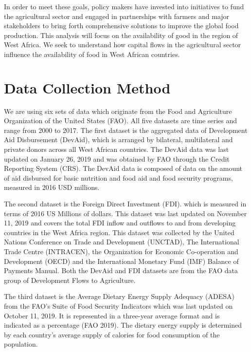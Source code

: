 \documentclass[
]{article}
\begin{document}
In order to meet these goals, policy makers have invested into
initiatives to fund the agricultural sector and engaged in partnerships
with farmers and major stakeholders to bring forth comprehensive
solutions to improve the global food production. This analysis will
focus on the availability of good in the region of West Africa. We seek
to understand how capital flows in the agricultural sector influence the
availability of food in West African countries.

\hypertarget{data-collection-method}{%
\section{Data Collection Method}\label{data-collection-method}}

We are using six sets of data which originate from the Food and
Agriculture Organization of the United States (FAO). All five datasets
are time series and range from 2000 to 2017. The first dataset is the
aggregated data of Development Aid Disbursement (DevAid), which is
arranged by bilateral, multilateral and private donors across all West
African countries. The DevAid data was last updated on January 26, 2019
and was obtained by FAO through the Credit Reporting System (CRS). The
DevAid data is composed of data on the amount of aid disbursed for basic
nutrition and food aid and food security programs, measured in 2016 USD
millions.

The second dataset is the Foreign Direct Investment (FDI). which is
measured in terms of 2016 US Millions of dollars. This dataset was last
updated on November 11, 2019 and covers the total FDI inflow and
outflows to and from developing countries in the West Africa region.
This dataset was collected by the United Nations Conference on Trade and
Development (UNCTAD), The International Trade Centre (INTRACEN), the
Organization for Economic Co-operation and Development (OECD) and the
International Monetary Fund (IMF) Balance of Payments Manual. Both the
DevAid and FDI datasets are from the FAO data group of Development Flows
to Agriculture.

The third dataset is the Average Dietary Energy Supply Adequacy (ADESA)
from the FAO's Suite of Food Security Indicators which was last updated
on October 11, 2019. It is represented in a three-year average format
and is indicated as a percentage (FAO 2019). The dietary energy supply
is determined by each country's average supply of calories for food
consumption of the population.
\end{document}
